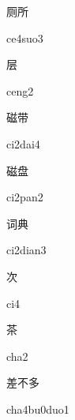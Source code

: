 \begin{verbete}[ce4suo3]{厕所}
\begin{pronuncia}{ce4suo3}
\end{pronuncia}
\end{verbete}

\begin{verbete}[ceng2]{层}
\begin{pronuncia}{ceng2}
\end{pronuncia}
\end{verbete}

\begin{verbete}[ci2dai4]{磁带}
\begin{pronuncia}{ci2dai4}
\end{pronuncia}
\end{verbete}

\begin{verbete}[ci2pan2]{磁盘}
\begin{pronuncia}{ci2pan2}
\end{pronuncia}
\end{verbete}

\begin{verbete}[ci2dian3]{词典}
\begin{pronuncia}{ci2dian3}
\end{pronuncia}
\end{verbete}

\begin{verbete}[ci4]{次}
\begin{pronuncia}{ci4}
\end{pronuncia}
\end{verbete}

\begin{verbete}[cha2]{茶}
\begin{pronuncia}{cha2}
\end{pronuncia}
\end{verbete}

\begin{verbete}{差不多}
\begin{pronuncia}{cha4bu0duo1}
\end{pronuncia}
\end{verbete}

